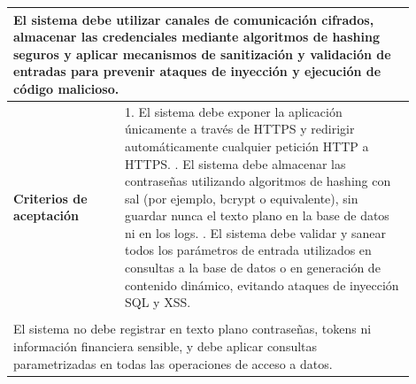 \begin{longtable}{|p{0.25\linewidth}|p{0.15\linewidth}|p{0.15\linewidth}|p{0.35\linewidth}|}
		\multicolumn{4}{|p{0.96\linewidth}|}{%
		El sistema debe utilizar canales de comunicación cifrados, almacenar las credenciales mediante algoritmos de hashing seguros y aplicar mecanismos de sanitización y validación de entradas para prevenir ataques de inyección y ejecución de código malicioso.} \\ \hline
		\cellcolor{tableheaderblue}\textbf{Criterios de aceptación} & \multicolumn{3}{p{0.70\linewidth}|}{                                                                                                                                                              %
			1. El sistema debe exponer la aplicación únicamente a través de HTTPS y redirigir automáticamente cualquier petición HTTP a HTTPS. \newline
			2. El sistema debe almacenar las contraseñas utilizando algoritmos de hashing con sal (por ejemplo, bcrypt o equivalente), sin guardar nunca el texto plano en la base de datos ni en los logs. \newline
		3. El sistema debe validar y sanear todos los parámetros de entrada utilizados en consultas a la base de datos o en generación de contenido dinámico, evitando ataques de inyección SQL y XSS.}                                                                 \\ \hline
		\rowcolor{tableheaderblue}
		\multicolumn{4}{|l|}{\textbf{Restricciones}}                                                                                                                                                                                                                    \\ \hline
		\multicolumn{4}{|p{0.96\linewidth}|}{%
		El sistema no debe registrar en texto plano contraseñas, tokens ni información financiera sensible, y debe aplicar consultas parametrizadas en todas las operaciones de acceso a datos.}                                                                        \\ \hline
	
\end{longtable}
\endgroup



